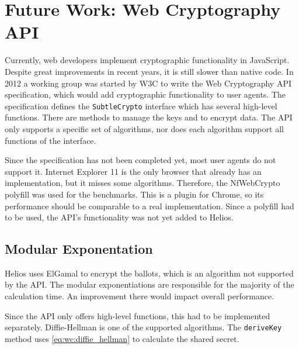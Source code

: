 %
%

\section{Future Work: Web Cryptography API}
\label{sec:web_cryptography_api}

Currently, web developers implement cryptographic functionality in JavaScript. Despite great improvements in recent years, it is still slower than native code.\cite{site:resig_javascript_performance_rundown}\cite{site:cois_javascript_performance_rundown_2012}\cite{smedberg_performance_analysis_of_javascript} In 2012 a working group was started by W3C to write the Web Cryptography API specification, which would add cryptographic functionality to user agents.\cite{wiki:webcrypto} The specification defines the \texttt{SubtleCrypto} interface which has several high-level functions.\cite{sleevi_watson_web_cryptography_api} There are methods to manage the keys and to encrypt data. The API only supports a specific set of algorithms, nor does each algorithm support all functions of the interface.

\par Since the specification has not been completed yet, most user agents do not support it. Internet Explorer 11 is the only browser that already has an implementation, but it misses some algorithms.\cite{site:microsoft_web_cryptography} Therefore, the NfWebCrypto polyfill was used for the benchmarks. This is a \cplusplus plugin for Chrome, so its performance should be comparable to a real implementation. Since a polyfill had to be used, the API's functionality was not yet added to Helios.

\subsection{Modular Exponentation}
\label{sec:wc:modular_exponentiation}

Helios uses ElGamal to encrypt the ballots, which is an algorithm not supported by the API. The modular exponentiations are responsible for the majority of the calculation time. An improvement there would impact overall performance.

\par Since the API only offers high-level functions, this had to be implemented separately. Diffie-Hellman is one of the supported algorithms. The \texttt{deriveKey} method uses \ref{eq:wc:diffie_hellman} to calculate the shared secret.\cite{diffie_hellman_new_directions_in_cryptography}

